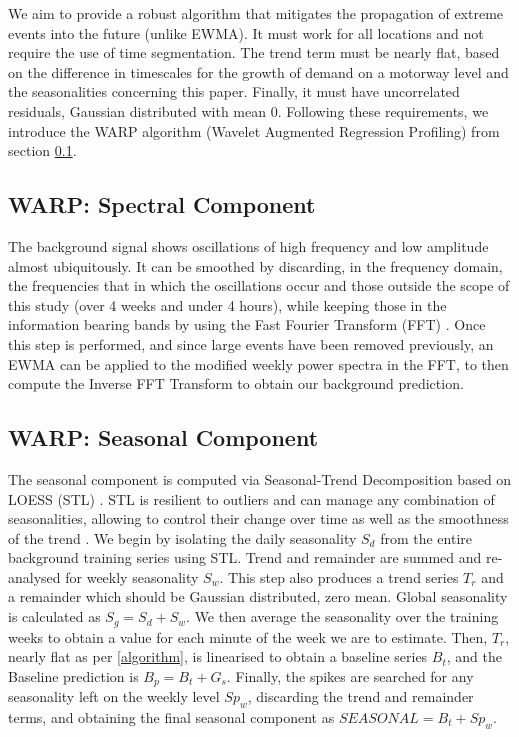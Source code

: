 \documentclass[a4paper, 10pt, conference]{ieeeconf}      %
\begin{document}
We aim to provide a robust algorithm that mitigates the propagation of extreme events into the future (unlike EWMA). 
It must work for all locations and not require the use of time segmentation. The trend term must be nearly flat, based on the difference in timescales for the growth of demand on a motorway level and the seasonalities concerning this paper. 
Finally, it must have uncorrelated residuals, Gaussian distributed with mean 0.
Following these requirements, we introduce the WARP algorithm (Wavelet Augmented Regression Profiling) from section \ref{algostart}.

\subsection{WARP: Spectral Component}
\label{algostart}
The background signal shows oscillations of high frequency and low amplitude almost ubiquitously. 
It can be smoothed by discarding, in the frequency domain, the frequencies that in which the oscillations occur and those outside the scope of this study (over 4 weeks and under 4 hours), while keeping those in the information bearing bands by using the Fast Fourier Transform (FFT) \cite{FFT}.
Once this step is performed, and since large events have been removed previously, an EWMA can be applied to the modified weekly power spectra in the FFT, to then compute the Inverse FFT Transform to obtain our background prediction.

\subsection{WARP: Seasonal Component}
The seasonal component is computed via Seasonal-Trend Decomposition based on LOESS (STL) \cite{STL}.
STL is resilient to outliers and can manage any combination of seasonalities, allowing to control their change over time as well as the smoothness of the trend \cite{forecasting}.
We begin by isolating the daily seasonality $S_d$ from the entire background training series using STL.
Trend and remainder are summed and re-analysed for weekly seasonality $S_w$. This step also produces a trend series $T_r$ and a remainder which should be Gaussian distributed, zero mean.
Global seasonality is calculated as $S_g = S_d + S_w$.
We then average the seasonality over the training weeks to obtain a value for each minute of the week we are to estimate.
Then, $T_r$, nearly flat as per \ref{algorithm}, is linearised to obtain a baseline series $B_t$, and the Baseline prediction is $B_p = B_t + G_s$.
Finally, the spikes are searched for any seasonality left on the weekly level $Sp_w$, discarding the trend and remainder terms, and obtaining the final seasonal component as $\textit{SEASONAL} = B_t + {Sp}_w$.
\end{document}
